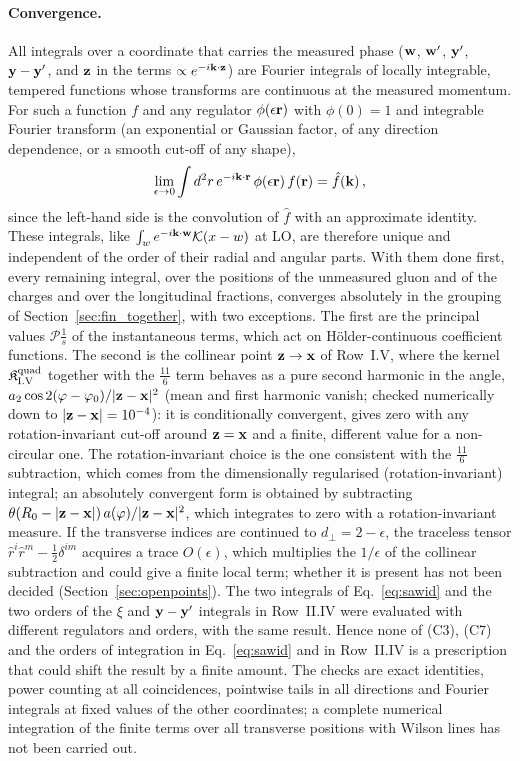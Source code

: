 \paragraph{Convergence.} All integrals over a coordinate that carries the measured phase ($\mathbf{w}$, $\mathbf{w}'$, $\mathbf{y}'$, $\mathbf{y}-\mathbf{y}'$, and $\mathbf{z}$ in the terms $\propto e^{-i\mathbf{k}\cdot\mathbf{z}}$) are Fourier integrals of locally integrable, tempered functions whose transforms are continuous at the measured momentum. For such a function $f$ and any regulator $\phi(\epsilon\mathbf{r})$ with $\phi(0)=1$ and integrable Fourier transform (an exponential or Gaussian factor, of any direction dependence, or a smooth cut-off of any shape),
\begin{align}\label{eq:FTlemma}
\lim_{\epsilon\to0}\int d^2r\,e^{-i\mathbf{k}\cdot\mathbf{r}}\,\phi(\epsilon\mathbf{r})\,f(\mathbf{r})=\hat f(\mathbf{k})\,,
\end{align}
since the left-hand side is the convolution of $\hat f$ with an approximate identity. These integrals, like $\int_we^{-i\mathbf{k}\cdot\mathbf{w}}\mathcal{K}(x-w)$ at LO, are therefore unique and independent of the order of their radial and angular parts. With them done first, every remaining integral, over the positions of the unmeasured gluon and of the charges and over the longitudinal fractions, converges absolutely in the grouping of Section~\ref{sec:fin_together}, with two exceptions. The first are the principal values $\mathcal P\frac1s$ of the instantaneous terms, which act on H\"older-continuous coefficient functions. The second is the collinear point $\mathbf{z}\to\mathbf{x}$ of Row~I.V, where the kernel $\mathfrak K^{\rm quad}_{\rm I.V}$ together with the $\frac{11}{6}$ term behaves as a pure second harmonic in the angle, $a_2\cos2(\varphi-\varphi_0)/|\mathbf{z}-\mathbf{x}|^2$ (mean and first harmonic vanish; checked numerically down to $|\mathbf{z}-\mathbf{x}|=10^{-4}$): it is conditionally convergent, gives zero with any rotation-invariant cut-off around $\mathbf{z}=\mathbf{x}$ and a finite, different value for a non-circular one. The rotation-invariant choice is the one consistent with the $\frac{11}{6}$ subtraction, which comes from the dimensionally regularised (rotation-invariant) integral; an absolutely convergent form is obtained by subtracting $\theta(R_0-|\mathbf{z}-\mathbf{x}|)\,a(\varphi)/|\mathbf{z}-\mathbf{x}|^2$, which integrates to zero with a rotation-invariant measure. If the transverse indices are continued to $d_\perp=2-\epsilon$, the traceless tensor $\hat r^i\hat r^m-\frac12\delta^{im}$ acquires a trace $O(\epsilon)$, which multiplies the $1/\epsilon$ of the collinear subtraction and could give a finite local term; whether it is present has not been decided (Section~\ref{sec:openpoints}). The two integrals of Eq.~\eqref{eq:sawid} and the two orders of the $\xi$ and $\mathbf{y}-\mathbf{y}'$ integrals in Row~II.IV were evaluated with different regulators and orders, with the same result. Hence none of (C3), (C7) and the orders of integration in Eq.~\eqref{eq:sawid} and in Row~II.IV is a prescription that could shift the result by a finite amount. The checks are exact identities, power counting at all coincidences, pointwise tails in all directions and Fourier integrals at fixed values of the other coordinates; a complete numerical integration of the finite terms over all transverse positions with Wilson lines has not been carried out.

